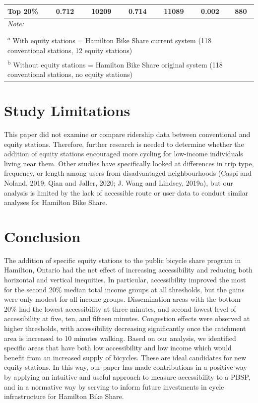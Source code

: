 \documentclass[]{elsarticle} %
\begin{document}
\begin{table}
{\begin{tabular}[t]{lcccccc}
\hspace{1em}Top 20\% & 0.712 & 10209 & 0.714 & 11089 & 0.002 & 880\\
\bottomrule
\multicolumn{7}{l}{\rule{0pt}{1em}\textit{Note: }}\\
\multicolumn{7}{l}{\rule{0pt}{1em} }\\
\multicolumn{7}{l}{\rule{0pt}{1em}\textsuperscript{a} With equity stations = Hamilton Bike Share current system (118 conventional stations, 12 equity stations)}\\
\multicolumn{7}{l}{\rule{0pt}{1em}\textsuperscript{b} Without equity stations = Hamilton Bike Share original system (118 conventional stations, no equity stations)}\\
\end{tabular}}
\end{table}

\hypertarget{study-limitations}{%
\section{Study Limitations}\label{study-limitations}}

This paper did not examine or compare ridership data between
conventional and equity stations. Therefore, further research is needed
to determine whether the addition of equity stations encouraged more
cycling for low-income individuals living near them. Other studies have
specifically looked at differences in trip type, frequency, or length
among users from disadvantaged neighbourhoods (Caspi and Noland, 2019;
Qian and Jaller, 2020; J. Wang and Lindsey, 2019a), but our analysis is
limited by the lack of accessible route or user data to conduct similar
analyses for Hamilton Bike Share.

\hypertarget{conclusion}{%
\section{Conclusion}\label{conclusion}}

The addition of specific equity stations to the public bicycle share
program in Hamilton, Ontario had the net effect of increasing
accessibility and reducing both horizontal and vertical inequities. In
particular, accessibility improved the most for the second 20\% median
total income groups at all thresholds, but the gains were only modest
for all income groups. Dissemination areas with the bottom 20\% had the
lowest accessibility at three minutes, and second lowest level of
accessibility at five, ten, and fifteen minutes. Congestion effects were
observed at higher thresholds, with accessibility decreasing
significantly once the catchment area is increased to 10 minutes
walking. Based on our analysis, we identified specific areas that have
both low accessibility and low income which would benefit from an
increased supply of bicycles. These are ideal candidates for new equity
stations. In this way, our paper has made contributions in a positive
way by applying an intuitive and useful approach to measure
accessibility to a PBSP, and in a normative way by serving to inform
future investments in cycle infrastructure for Hamilton Bike Share.
\end{document}
